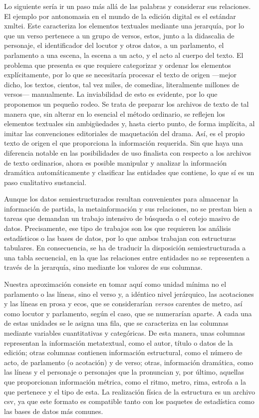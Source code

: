 Lo siguiente sería ir un paso más allá de las palabras y considerar sus relaciones. El ejemplo por antonomasia en el mundo de la edición digital es el estándar \ac{xmltei}. Este caracteriza los elementos textuales mediante una jerarquía, por lo que un verso pertenece a un grupo de versos, estos, junto a la didascalia de personaje, el identificador del locutor y otros datos, a un parlamento, el parlamento a una escena, la escena a un acto, y el acto al cuerpo del texto. El problema que presenta es que requiere categorizar y ordenar los elementos explícitamente, por lo que se necesitaría procesar el texto de origen —mejor dicho, los textos, cientos, tal vez miles, de comedias, literalmente millones de versos— manualmente. La inviabilidad de esto es evidente, por lo que proponemos un pequeño rodeo. Se trata de preparar los archivos de texto de tal manera que, sin alterar en lo esencial el método ordinario, se reflejen los elementos textuales sin ambigüedades y, hasta cierto punto, de forma implícita, al imitar las convenciones editoriales de maquetación del drama. Así, es el propio texto de origen el que proporciona la información requerida. Sin que haya una diferencia notable en las posibilidades de uso finalista con respecto a los archivos de texto ordinarios, ahora es posible manipular y analizar la información dramática automáticamente y clasificar las entidades que contiene, lo que sí es un paso cualitativo sustancial.

Aunque los datos semiestructurados resultan convenientes para almacenar la información de partida, la metainformación y sus relaciones, no se prestan bien a tareas que demandan un trabajo intensivo de búsqueda o el cotejo masivo de datos. Precisamente, ese tipo de trabajos son los que requieren los análisis estadísticos o las bases de datos, por lo que ambos trabajan con estructuras tabulares. En consecuencia, se ha de traducir la disposición semiestructurada a una tabla secuencial, en la que las relaciones entre entidades no se representen a través de la jerarquía, sino mediante los valores de sus columnas.

Nuestra aproximación consiste en tomar aquí como unidad mínima no el parlamento o las líneas, sino el verso y, a idéntico nivel jerárquico, las acotaciones y las líneas en prosa y ecos, que se considerarían \textit{versos} carentes de metro, así como locutor y parlamento, según el caso, que se numerarían aparte. A cada una de estas unidades se le asigna una fila, que se caracteriza en las columnas mediante variables cuantitativas y categóricas. De esta manera, unas columnas representan la información metatextual, como el autor, título o datos de la edición; otras columnas contienen información estructural, como el número de acto, de parlamento (o acotación) y de verso; otras, información dramática, como las líneas y el personaje o personajes que la pronuncian y, por último, aquellas que proporcionan información métrica, como el ritmo, metro, rima, estrofa a la que pertenece y el tipo de esta. La realización física de la estructura es un archivo \ac{csv}, ya que este formato es compatible tanto con los paquetes de estadística como las bases de datos más comunes.

